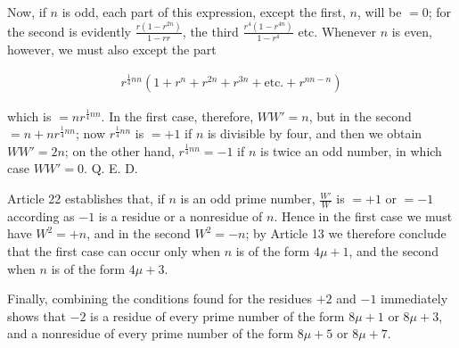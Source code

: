 Now, if $n$ is odd, each part of this expression, except the first, $n$, will be $=0$; for the second is evidently $\frac{r(1-r^{2n})}{1-rr}$, the third $\frac{r^4(1-r^{4n})}{1-r^4}$ etc. Whenever $n$ is even, however, we must also except the part


\[
\begin{aligned}
r^{\frac14nn}(1+r^n+r^{2n}+r^{3n}+\text{etc.}+r^{nn-n})
\end{aligned}
\]

which is $=nr^{\frac14nn}$. In the first case, therefore, $WW'=n$, but in the second $=n+nr^{\frac14nn}$; now $r^{\frac14nn}$ is $=+1$ if $n$ is divisible by four, and then we obtain $WW'=2n$; on the other hand, $r^{\frac14nn}=-1$ if $n$ is twice an odd number, in which case $WW'=0$. Q. E. D.


Article 22 establishes that, if $n$ is an odd prime number, $\frac{W'}{W}$ is $=+1$ or $=-1$ according as $-1$ is a residue or a nonresidue of $n$. Hence in the first case we must have $W^2=+n$, and in the second $W^2=-n$; by Article 13 we therefore conclude that the first case can occur only when $n$ is of the form $4\mu+1$, and the second when $n$ is of the form $4\mu+3$.

Finally, combining the conditions found for the residues $+2$ and $-1$ immediately shows that $-2$ is a residue of every prime number of the form $8\mu+1$ or $8\mu+3$, and a nonresidue of every prime number of the form $8\mu+5$ or $8\mu+7$.

\BookRule{42mm}
